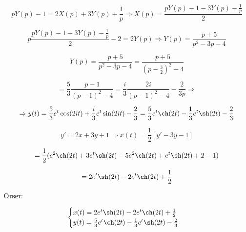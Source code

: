 \documentclass{article}
\begin{document}
\[
pY(p) - 1 = 2X(p) + 3Y(p) + \frac{1}{p} \Rightarrow X(p) = \frac{pY(p) - 1 - 3Y(p) - \frac{1}{p}}{2}
\]

\[
p\frac{pY(p) - 1 - 3Y(p) - \frac{1}{p}}{2} - 2 = 2Y(p) \Rightarrow Y(p) = \frac{p + 5}{p^2 - 3p - 4}
\]

\[
Y(p) = \frac{p + 5}{p^2 - 3p - 4} = \frac{p + 5}{(p - \frac{3}{2})^2 - 4}
\]

\[
= \frac{5}{3} \frac{p - 1}{(p - 1)^2 - 4} = \frac{i}{3} \frac{2i}{(p - 1)^2 - 4} - \frac{2}{3p} \Rightarrow
\]

\[
\Rightarrow y(t) = \frac{5}{3}e^t \cos(2it) + \frac{i}{3}e^t \sin(2it) - \frac{2}{3} = \frac{5}{3} e^t \ch(2t) - \frac{1}{3} e^t\sh(2t) - \frac{2}{3}
\]

\[
y' = 2x+3y +1 \Rightarrow x(t) = \frac{1}{2}[y' - 3y - 1]
\]

\[
= \frac{1}{2}(e^2\ch(2t) + 3 e^t\sh(2t) - 5e^2\ch(2t) + e^t\sh(2t) + 2 -1)
\]

\[
= 2e^t\sh(2t) - 2e^t\ch(2t) + \frac{1}{2}
\]



Ответ:

\[
\begin{cases}
x(t) = 2 e^t\sh(2t) - 2 e^t \ch(2t)+ \frac{1}{2} \\
y(t) = \frac{5}{3} e^t \ch(2t) - \frac{1}{3} e^t\sh(2t) - \frac{2}{3}
\end{cases}
\]
\end{document}
